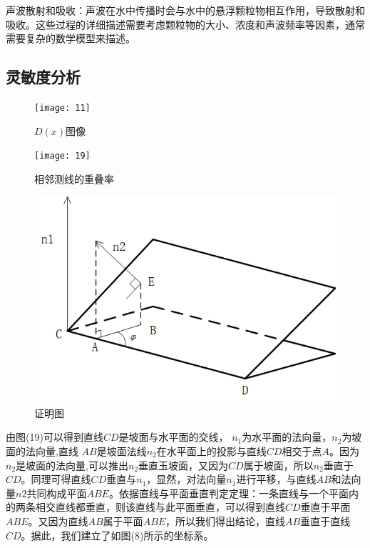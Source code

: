\documentclass[11pt,twoside,a4paper]{article}
\begin{document}
声波散射和吸收：声波在水中传播时会与水中的悬浮颗粒物相互作用，导致散射和吸收。这些过程的详细描述需要考虑颗粒物的大小、浓度和声波频率等因素，通常需要复杂的数学模型来描述。





\subsection{灵敏度分析}


\begin{figure}[h]
	\centering
	\texttt{[image: 11]}
	\caption{$D(x)$图像}
	\label{9}
\end{figure}

\begin{figure}[h]
	\centering
	\texttt{[image: 19]}
	\caption{相邻测线的重叠率}
	\label{9}
\end{figure}




\begin{figure}[h]
	\centering
	\includegraphics[scale=0.9]{21}
	\caption{证明图}
\end{figure}

由图(19)可以得到直线$CD$是坡面与水平面的交线， $n_1$为水平面的法向量，$n_2$为坡面的法向量,直线 $AB$是坡面法线$n_2$在水平面上的投影与直线$CD$相交于点$A$。因为$n_2$是坡面的法向量,可以推出$n_2$垂直玉坡面，又因为$CD$属于坡面，所以$n_2$垂直于$CD$。同理可得直线$CD$垂直与$n_1$，显然，对法向量$n_1$进行平移，与直线$AB$和法向量$n2$共同构成平面$ABE$。依据直线与平面垂直判定定理：一条直线与一个平面内的两条相交直线都垂直，则该直线与此平面垂直，可以得到直线$CD$垂直于平面$ABE$。又因为直线$AB$属于平面$ABE$，所以我们得出结论，直线$AB$垂直于直线$CD$。据此，我们建立了如图(8)所示的坐标系。
\end{document}
